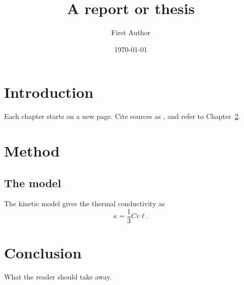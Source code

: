\documentclass[11pt]{report}
\title{A report or thesis}
\author{First Author}
\date{\today}
\begin{document}
\maketitle
\tableofcontents

\chapter{Introduction}
\label{ch:intro}
Each chapter starts on a new page. Cite sources as \cite{callaway1959}, and refer to Chapter~\ref{ch:method}.

\chapter{Method}
\label{ch:method}
\section{The model}
The kinetic model gives the thermal conductivity as
\begin{equation}
  \kappa = \frac{1}{3} C v \ell .
\end{equation}

\chapter{Conclusion}
What the reader should take away.



\end{document}
